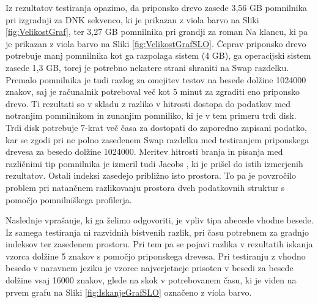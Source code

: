 Iz rezultatov testiranja opazimo, da priponsko drevo zasede 3,56 GB pomnilnika pri izgradnji za DNK sekvenco, ki je prikazan z viola barvo na Sliki \ref{fig:VelikostGraf}, ter 3,27 GB pomnilnika pri grandji za roman Na klancu, ki pa je prikazan z viola barvo na Sliki \ref{fig:VelikostGrafSLO}. Čeprav priponsko drevo potrebuje manj pomnilnika kot ga razpolaga sistem (4 GB), ga operacijski sistem zasede 1,3 GB, torej je potrebno nekatere strani shraniti na Swap razdelku. Premalo pomnilnika je tudi razlog za omejitev testov na besede dolžine 1024000 znakov, saj je računalnik potreboval več kot 5 minut za zgraditi eno priponsko drevo. Ti rezultati so v skladu z razliko v hitrosti dostopa do podatkov med notranjim pomnilnikom in zunanjim pomniliko, ki je v tem primeru trdi disk. Trdi disk potrebuje 7-krat več časa za dostopati do zaporedno zapisani podatko, kar se zgodi pri ne polno zasedenem Swap razdelku med testiranjem priponskega drevesa za besedo dolžine 1024000. Meritev hitrosti branja in pisanja med različnimi tip pomnilnika je izmeril tudi Jacobs \cite{Jacobs2009}, ki je prišel do istih izmerjenih rezultatov. Ostali indeksi zasedejo približno isto prostora. To pa je povzročilo problem pri natančnem razlikovanju prostora dveh podatkovnih struktur s pomočjo pomnilniškega profilerja.

Naslednje vprašanje, ki ga želimo odgovoriti, je vpliv tipa abecede vhodne besede. Iz samega testiranja ni razvidnih bistvenih razlik, pri času potrebnem za gradnjo indeksov ter zasedenem prostoru. Pri tem pa se pojavi razlika v rezultatih iskanja vzorca dolžine 5 znakov s pomočjo priponskega drevesa. Pri testiranju z vhodno besedo v naravnem jeziku je vzorec najverjetneje prisoten v besedi za besede dolžine vsaj 16000 znakov, glede na skok v potrebovanem času, ki je viden na prvem grafu na Sliki \ref{fig:IskanjeGrafSLO} označeno z viola barvo.

